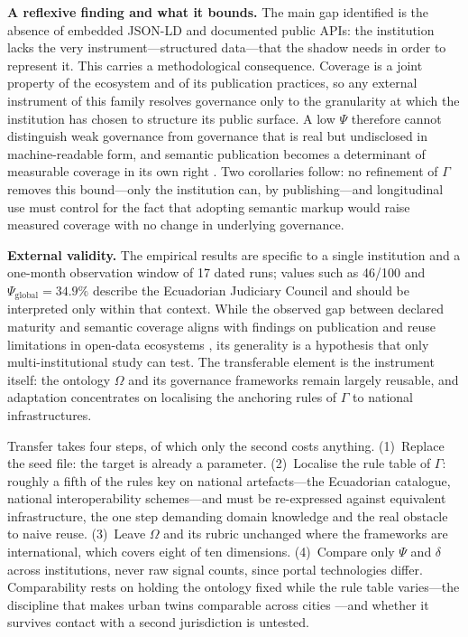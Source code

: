 \documentclass[engproc,proceedingpaper,submit,moreauthors]{Definitions/mdpi}
\begin{document}
\textbf{A reflexive finding and what it bounds.}
    The main gap identified is the absence of embedded JSON-LD and documented public APIs: the institution lacks the very instrument---structured data---that the shadow needs in order to represent it. This carries a methodological consequence. Coverage is a joint property of the ecosystem and of its publication practices, so any external instrument of this family resolves governance only to the granularity at which the institution has chosen to structure its public surface. A low $\Psi$ therefore cannot distinguish weak governance from governance that is real but undisclosed in machine-readable form, and semantic publication becomes a determinant of measurable coverage in its own right \cite{Guha2016}. Two corollaries follow: no refinement of $\Gamma$ removes this bound---only the institution can, by publishing---and longitudinal use must control for the fact that adopting semantic markup would raise measured coverage with no change in underlying governance.

\textbf{External validity.}
    The empirical results are specific to a single institution and a one-month observation window of 17 dated runs; values such as 46/100 and $\Psi_{\mathrm{global}}=34.9\%$ describe the Ecuadorian Judiciary Council and should be interpreted only within that context. While the observed gap between declared maturity and semantic coverage aligns with findings on publication and reuse limitations in open-data ecosystems \cite{Janssen2012,Attard2015,Neumaier2016}, its generality is a hypothesis that only multi-institutional study can test. The transferable element is the instrument itself: the ontology $\Omega$ and its governance frameworks remain largely reusable, and adaptation concentrates on localising the anchoring rules of $\Gamma$ to national infrastructures.

    Transfer takes four steps, of which only the second costs anything. (1)~Replace the seed file: the target is already a parameter. (2)~Localise the rule table of $\Gamma$: roughly a fifth of the rules key on national artefacts---the Ecuadorian catalogue, national interoperability schemes---and must be re-expressed against equivalent infrastructure, the one step demanding domain knowledge and the real obstacle to naive reuse. (3)~Leave $\Omega$ and its rubric unchanged where the frameworks are international, which covers eight of ten dimensions. (4)~Compare only $\Psi$ and $\delta$ across institutions, never raw signal counts, since portal technologies differ. Comparability rests on holding the ontology fixed while the rule table varies---the discipline that makes urban twins comparable across cities \cite{Shahat2021,Haraguchi2024}---and whether it survives contact with a second jurisdiction is untested.
\end{document}
